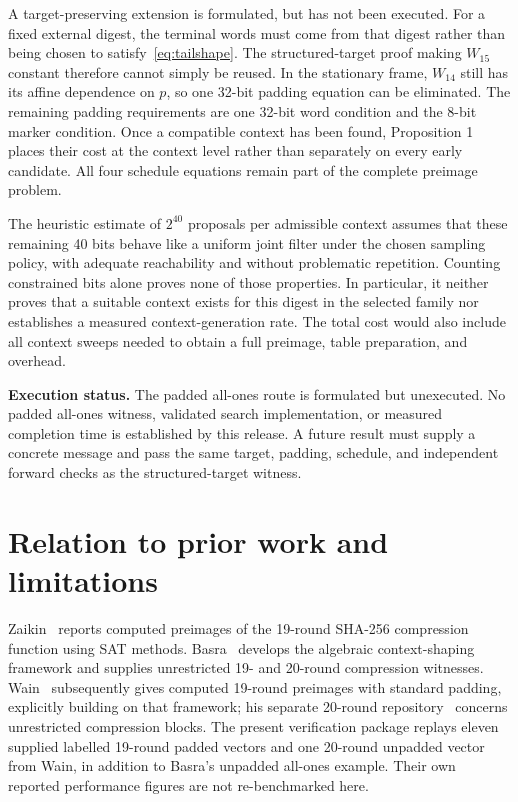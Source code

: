 \documentclass[11pt,a4paper]{article}
\begin{document}
A target-preserving extension is formulated, but has not been executed. For a fixed external digest, the terminal words must come from that digest rather than being chosen to satisfy~\eqref{eq:tailshape}. The structured-target proof making $W_{15}$ constant therefore cannot simply be reused. In the stationary frame, $W_{14}$ still has its affine dependence on $p$, so one 32-bit padding equation can be eliminated. The remaining padding requirements are one 32-bit word condition and the 8-bit marker condition. Once a compatible context has been found, Proposition 1 places their cost at the context level rather than separately on every early candidate. All four schedule equations remain part of the complete preimage problem.

The heuristic estimate of $2^{40}$ proposals per admissible context assumes that these remaining 40 bits behave like a uniform joint filter under the chosen sampling policy, with adequate reachability and without problematic repetition. Counting constrained bits alone proves none of those properties. In particular, it neither proves that a suitable context exists for this digest in the selected family nor establishes a measured context-generation rate. The total cost would also include all context sweeps needed to obtain a full preimage, table preparation, and overhead.

\textbf{Execution status.} The padded all-ones route is formulated but unexecuted. No padded all-ones witness, validated search implementation, or measured completion time is established by this release. A future result must supply a concrete message and pass the same target, padding, schedule, and independent forward checks as the structured-target witness.

\section{Relation to prior work and limitations}
Zaikin~\cite{zaikin} reports computed preimages of the 19-round SHA-256 compression function using SAT methods. Basra~\cite{basra} develops the algebraic context-shaping framework and supplies unrestricted 19- and 20-round compression witnesses. Wain~\cite{wain19} subsequently gives computed 19-round preimages with standard padding, explicitly building on that framework; his separate 20-round repository~\cite{wain20} concerns unrestricted compression blocks. The present verification package replays eleven supplied labelled 19-round padded vectors and one 20-round unpadded vector from Wain, in addition to Basra's unpadded all-ones example. Their own reported performance figures are not re-benchmarked here.
\end{document}
